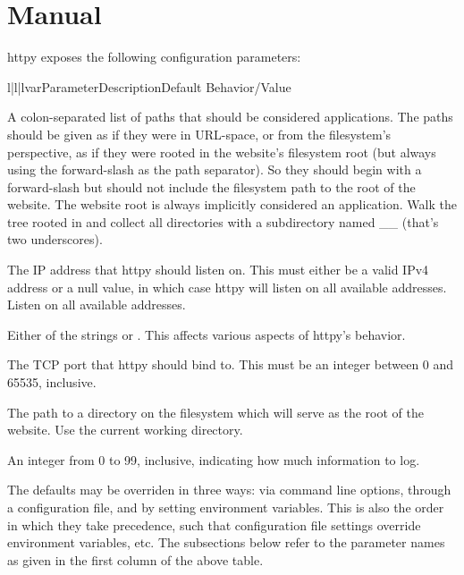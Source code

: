 \chapter{Manual \label{manual}}

httpy exposes the following configuration parameters:


\begin{tableiii}{l|l|l}{var}{Parameter}{Description}{Default Behavior/Value}

    {A colon-separated list of paths that should be considered applications. The
    paths should be given as if they were in URL-space, or from the filesystem's
    perspective, as if they were rooted in the website's filesystem root (but
    always using the forward-slash as the path separator). So they should begin
    with a forward-slash but should not include the filesystem path to the root
    of the website. The website root is always implicitly considered an
    application.}
    {Walk the tree rooted in  and collect all directories with a
    subdirectory named __ (that's two underscores).}

    {The IP address that httpy should listen on. This must either be a valid
    IPv4 address or a null value, in which case httpy will listen on all
    available addresses.}
    {Listen on all available addresses.}

    {Either of the strings  or . This affects
    various aspects of httpy's behavior.}
    {}

    {The TCP port that httpy should bind to. This must be an integer between 0
    and 65535, inclusive.}
    {}

    {The path to a directory on the filesystem which will serve as the root of
    the website.}
    {Use the current working directory.}

    {An integer from 0 to 99, inclusive, indicating how much information to
    log.}
    {}

\end{tableiii}

The defaults may be overriden in three ways: via command line options, through a
configuration file, and by setting environment variables. This is also the order
in which they take precedence, such that configuration file settings override
environment variables, etc. The subsections below refer to the parameter names
as given in the first column of the above table.




